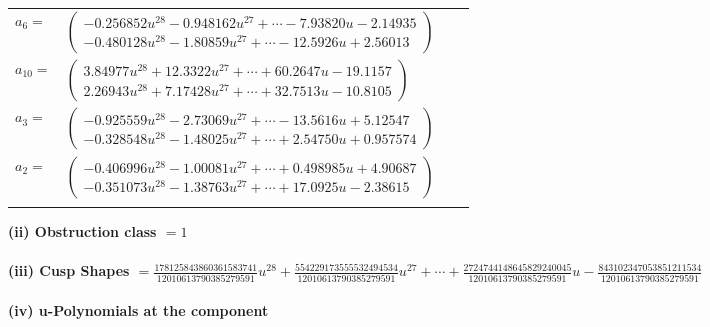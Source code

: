\documentclass[1p]{elsarticle_modified}
\theoremstyle{definition}
\begin{document}
\begin{tabular}{m{7pt} m{180pt} m{7pt} m{180pt} }
\flushright $a_{6}=$&$\begin{pmatrix}-0.256852 u^{28}-0.948162 u^{27}+\cdots-7.93820 u-2.14935\\-0.480128 u^{28}-1.80859 u^{27}+\cdots-12.5926 u+2.56013\end{pmatrix}$ \\
\flushright $a_{10}=$&$\begin{pmatrix}3.84977 u^{28}+12.3322 u^{27}+\cdots+60.2647 u-19.1157\\2.26943 u^{28}+7.17428 u^{27}+\cdots+32.7513 u-10.8105\end{pmatrix}$ \\
\flushright $a_{3}=$&$\begin{pmatrix}-0.925559 u^{28}-2.73069 u^{27}+\cdots-13.5616 u+5.12547\\-0.328548 u^{28}-1.48025 u^{27}+\cdots+2.54750 u+0.957574\end{pmatrix}$ \\
\flushright $a_{2}=$&$\begin{pmatrix}-0.406996 u^{28}-1.00081 u^{27}+\cdots+0.498985 u+4.90687\\-0.351073 u^{28}-1.38763 u^{27}+\cdots+17.0925 u-2.38615\end{pmatrix}$\\&\end{tabular}
\flushleft \textbf{(ii) Obstruction class $= 1$}\\~\\
\flushleft \textbf{(iii) Cusp Shapes $= \frac{178125843860361583741}{12010613790385279591} u^{28}+\frac{554229173555532494534}{12010613790385279591} u^{27}+\cdots+\frac{2724744148645829240045}{12010613790385279591} u-\frac{843102347053851211534}{12010613790385279591}$}\\~\\
\newpage\renewcommand{\arraystretch}{1}
\flushleft \textbf{(iv) u-Polynomials at the component}\newline \\
\end{document}
